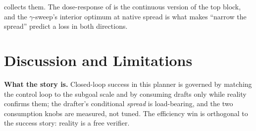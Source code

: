 \documentclass{article}
\begin{document}
 collects them. The dose-response of  is the
continuous version of the top block, and the $\gamma$-sweep's interior optimum at
native spread is what makes ``narrow the spread'' predict a loss in both directions.

\section{Discussion and Limitations}
\label{sec:discussion}
\textbf{What the story is.} Closed-loop success in this planner is governed by matching
the control loop to the subgoal scale and by consuming drafts only while reality
confirms them; the drafter's conditional \emph{spread} is load-bearing, and the two
consumption knobs are measured, not tuned. The efficiency win is orthogonal to the
success story: reality is a free verifier.
\end{document}
